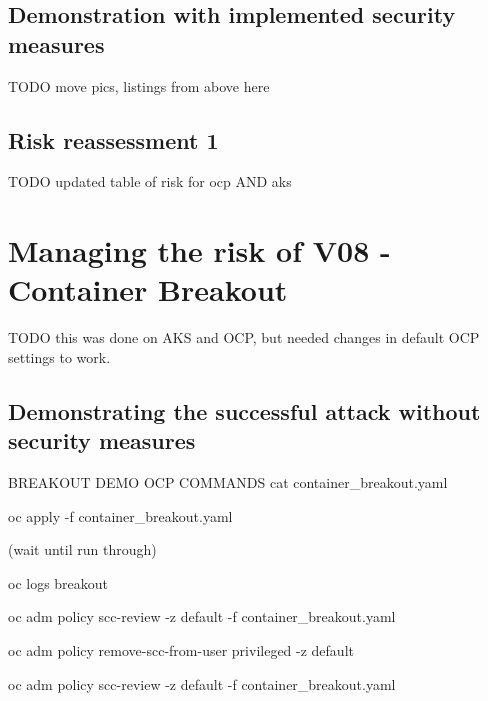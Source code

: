 \subsection{Demonstration with implemented security measures}

TODO move pics, listings from above here

\subsection{Risk reassessment 1}

TODO updated table of risk for ocp AND aks

\section{Managing the risk of V08 - Container Breakout}
TODO this was done on AKS and OCP, but needed changes in default OCP settings to work.

\subsection{Demonstrating the successful attack without security measures}

BREAKOUT DEMO OCP COMMANDS
\iffalse
cat container_breakout.yaml

oc apply -f container_breakout.yaml

(wait until run through)

oc logs breakout

oc adm policy scc-review -z default -f container_breakout.yaml

oc adm policy remove-scc-from-user privileged -z default

oc adm policy scc-review -z default -f container_breakout.yaml

